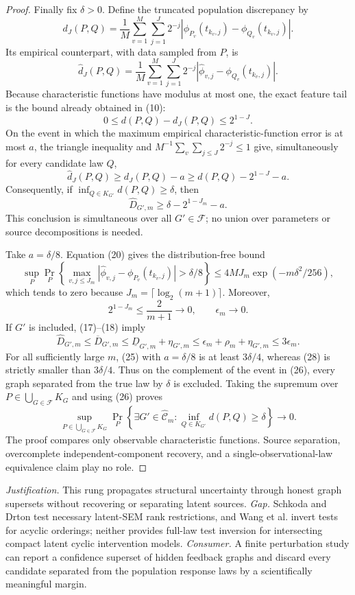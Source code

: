 \documentclass{article}
\begin{document}
\begin{proof}
Finally fix \(\delta>0\).  Define the truncated population discrepancy by
\[
 d_J(P,Q)=\frac1M\sum_{v=1}^M\sum_{j=1}^{J}2^{-j}
 |\phi_{P_v}(t_{k_v,j})-\phi_{Q_v}(t_{k_v,j})|.
\]
Its empirical counterpart, with data sampled from \(P\), is
\[
 \widehat d_J(P,Q)=\frac1M\sum_{v=1}^M\sum_{j=1}^{J}2^{-j}
 |\widehat\phi_{v,j}-\phi_{Q_v}(t_{k_v,j})|.
\]
Because characteristic functions have modulus at most one, the exact feature
tail is the bound already obtained in (10):
\[
 0\leq d(P,Q)-d_J(P,Q)\leq2^{1-J}.
 \tag{23}
\]
On the event in which the maximum empirical characteristic-function error is
at most \(a\), the triangle inequality and
\(M^{-1}\sum_v\sum_{j\leq J}2^{-j}\leq1\) give, simultaneously for every
candidate law \(Q\),
\[
 \widehat d_J(P,Q)\geq d_J(P,Q)-a
 \geq d(P,Q)-2^{1-J}-a.
 \tag{24}
\]
Consequently, if
\(\inf_{Q\in K_{G'}}d(P,Q)\geq\delta\), then
\[
 \widehat D_{G',m}
 \geq\delta-2^{1-J_m}-a.
 \tag{25}
\]
This conclusion is simultaneous over all \(G'\in\mathcal F\); no union over
parameters or source decompositions is needed.

Take \(a=\delta/8\).  Equation (20) gives the distribution-free bound
\[
 \sup_P\Pr_P\left\{
   \max_{v,j\leq J_m}
   |\widehat\phi_{v,j}-\phi_{P_v}(t_{k_v,j})|>\delta/8
 \right\}
 \leq4MJ_m\exp(-m\delta^2/256),
 \tag{26}
\]
which tends to zero because \(J_m=\lceil\log_2(m+1)\rceil\).  Moreover,
\[
 2^{1-J_m}\leq\frac{2}{m+1}\longrightarrow0,
 \qquad
 \epsilon_m\longrightarrow0.
 \tag{27}
\]
If \(G'\) is included, (17)--(18) imply
\[
 \widehat D_{G',m}
 \leq\overline D_{G',m}
 \leq\underline D_{G',m}+\eta_{G',m}
 \leq\epsilon_m+\rho_m+\eta_{G',m}
 \leq3\epsilon_m.
 \tag{28}
\]
For all sufficiently large \(m\), (25) with \(a=\delta/8\) is at least
\(3\delta/4\), whereas (28) is strictly smaller than \(3\delta/4\).
Thus on the complement of the event in (26), every graph separated from the
true law by \(\delta\) is excluded.  Taking the supremum over
\(P\in\bigcup_{G\in\mathcal F}K_G\) and using (26) proves
\[
 \sup_{P\in\bigcup_{G\in\mathcal F}K_G}
 \Pr_P\!\left\{\exists G'\in\widehat{\mathcal C}_m:
     \inf_{Q\in K_{G'}}d(P,Q)\geq\delta\right\}
 \longrightarrow0.
\]
The proof compares only observable characteristic functions.  Source
separation, overcomplete independent-component recovery, and a
single-observational-law equivalence claim play no role.
\end{proof}
\par\smallskip\noindent \textit{Justification.} This rung propagates structural uncertainty through honest graph supersets without recovering or separating latent sources. \textit{Gap.} Schkoda and Drton test necessary latent-SEM rank restrictions, and Wang et al. invert tests for acyclic orderings; neither provides full-law test inversion for intersecting compact latent cyclic intervention models. \textit{Consumer.} A finite perturbation study can report a confidence superset of hidden feedback graphs and discard every candidate separated from the population response laws by a scientifically meaningful margin.
\end{document}
